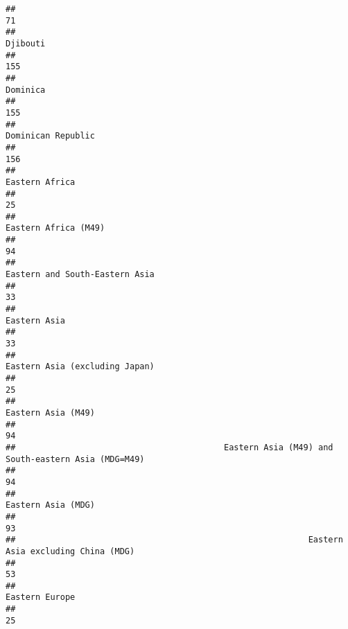 \documentclass[]{article}
\begin{document}
\begin{verbatim}
##                                                                                           71 
##                                                                                     Djibouti 
##                                                                                          155 
##                                                                                     Dominica 
##                                                                                          155 
##                                                                           Dominican Republic 
##                                                                                          156 
##                                                                               Eastern Africa 
##                                                                                           25 
##                                                                         Eastern Africa (M49) 
##                                                                                           94 
##                                                               Eastern and South-Eastern Asia 
##                                                                                           33 
##                                                                                 Eastern Asia 
##                                                                                           33 
##                                                               Eastern Asia (excluding Japan) 
##                                                                                           25 
##                                                                           Eastern Asia (M49) 
##                                                                                           94 
##                                          Eastern Asia (M49) and South-eastern Asia (MDG=M49) 
##                                                                                           94 
##                                                                           Eastern Asia (MDG) 
##                                                                                           93 
##                                                           Eastern Asia excluding China (MDG) 
##                                                                                           53 
##                                                                               Eastern Europe 
##                                                                                           25 

\end{verbatim}
\end{document}

